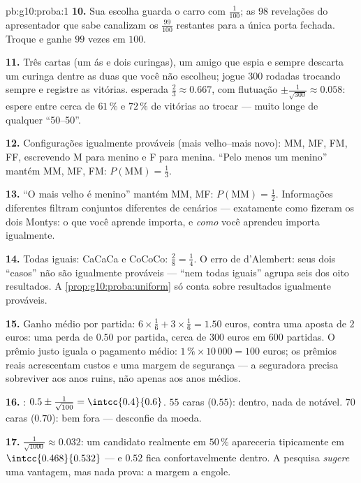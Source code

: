 \begin{solution}{pb:g10:proba:1}
\textbf{10.} Sua escolha guarda o carro com 
$\frac{1}{100}$; as $98$ revelações do apresentador que sabe
canalizam os $\frac{99}{100}$ restantes para a única porta
fechada. Troque e ganhe $99$ vezes em $100$.

\textbf{11.} Três cartas (um ás e dois curingas), um amigo que
espia e sempre descarta um curinga dentre as duas que você não
escolheu; jogue $300$ rodadas trocando sempre e registre as
vitórias.  esperada $\frac23 \approx 0.667$, com
flutuação $\pm\frac{1}{\sqrt{300}} \approx 0.058$: espere entre
cerca de $61\,\%$ e $72\,\%$ de vitórias ao trocar --- muito
longe de qualquer ``50--50''.

\textbf{12.} Configurações igualmente prováveis (mais
velho--mais novo): MM, MF, FM, FF, escrevendo M para menino e F
para menina. ``Pelo menos um menino'' mantém MM, MF, FM:
$P(\text{MM}) = \frac13$.

\textbf{13.} ``O mais velho é menino'' mantém MM, MF:
$P(\text{MM}) = \frac12$. Informações diferentes filtram
conjuntos diferentes de cenários --- exatamente como fizeram os
dois Montys: o que você aprende importa, e \emph{como} você
aprendeu importa igualmente.

\textbf{14.} Todas iguais: CaCaCa e CoCoCo: $\frac28 = \frac14$.
O erro de d'Alembert: seus dois ``casos'' não são igualmente
prováveis --- ``nem todas iguais'' agrupa seis dos oito
resultados. A \cref{prop:g10:proba:uniform} só conta sobre
resultados igualmente prováveis.

\textbf{15.} Ganho médio por partida: $6 \times \frac16 + 3
\times \frac16 = 1.50$ euros, contra uma aposta de $2$ euros:
uma perda  de $0.50$ por partida, cerca de $300$ euros em
$600$ partidas. O prêmio justo iguala o pagamento médio:
$1\,\% \times 10\,000 = 100$ euros; os prêmios reais acrescentam
custos e uma margem de segurança --- a seguradora precisa
sobreviver aos anos ruins, não apenas aos anos médios.

\textbf{16.} : $0.5 \pm \frac{1}{\sqrt{100}} =
\intcc{0.4}{0.6}$. $55$ caras ($0.55$): dentro, nada de
notável. $70$ caras ($0.70$): bem fora --- desconfie da moeda.

\textbf{17.} $\frac{1}{\sqrt{1000}} \approx 0.032$: um candidato
realmente em $50\,\%$ apareceria tipicamente em
$\intcc{0.468}{0.532}$ --- e $0.52$ fica confortavelmente
dentro. A pesquisa \emph{sugere} uma vantagem, mas nada prova:
a margem a engole.


\end{solution}
